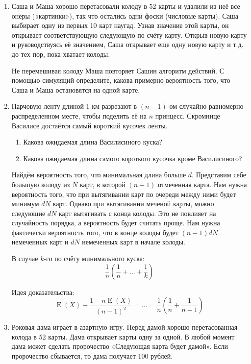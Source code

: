 \documentclass[nobib]{tufte-handout}
\DeclareMathOperator{\E}{E}
\begin{document}
\begin{enumerate}
\item Саша и Маша хорошо перетасовали колоду в 52 карты и удалили из неё все онёры («картинки»), так что остались одни фоски (числовые карты). Саша выбирает одну из первых 10 карт наугад. Узнав значение этой карты, он открывает соответствующую следующую по счёту карту. Открыв новую карту и руководствуясь её значением, Саша открывает еще одну новую карту и т.д. до тех пор, пока хватает колоды. 

Не перемешивая колоду Маша повторяет Сашин алгоритм действий. С помощью симуляций определите, какова примерно вероятность того, что Саша и Маша остановятся на одной карте.

\item Парчовую ленту длиной 1 км разрезают в $(n-1)$-ом случайно равномерно распределенном месте, чтобы поделить её на $n$ принцесс. Скромнице Василисе достаётся самый короткий кусочек ленты. 

\begin{enumerate}
\item Какова ожидаемая длина Василисиного куска?
\item Какова ожидаемая длина самого короткого кусочка кроме Василисиного?
\end{enumerate}

\begin{solution}
Найдём вероятность того, что минимальная длина больше $d$. Представим себе большую колоду из $N$ карт, в которой $(n-1)$ отмеченная карта. Нам нужна вероятность того, что при вытягивании карт по очереди между ними будет минимум $dN$ карт. Однако при вытягивании меченой карты, можно следующие $dN$ карт вытягивать с конца колоды. Это не повлияет на случайность порядка, а вероятность будет считать проще. Нам нужна фактически вероятность того, что в конце колоды будет $(n-1)dN$ немеченных карт и $dN$ немеченных карт в начале колоды.


В случае $k$-го по счёту минимального куска:
\[
\frac{1}{n}\left( \frac{1}{n} + \ldots + \frac{1}{k}\right)
\]

Идея доказательства:
\[
\E(X) + \frac{1-n\E(X)}{(n-1)^2}=\ldots=\frac{1}{n}\left( \frac{1}{n} + \frac{1}{n-1}\right)
\]
\end{solution}


\item  Роковая дама играет в азартную игру. Перед дамой хорошо перетасованная колода в 52 карты. Дама открывает карты одну за одной. В любой момент дама может сделать пророчество «Следующая карта будет дамой». Если пророчество сбывается, то дама получает 100 рублей. 


\end{enumerate}
\end{document}
